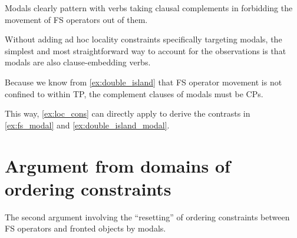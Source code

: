 \documentclass[11pt]{article}
\let\latextextsubscript\textsubscript
\let\textsubscript\latextextsubscript
\newcommand{\gap}[1]{\rule{1em}{0.4pt}\textsubscript{#1}}
\newcommand{\F}{\ensuremath{_{\mathrm{F}}}}
\begin{document}

Modals clearly pattern with verbs taking clausal complements in forbidding the movement of FS operators out of them.

Without adding ad hoc locality constraints specifically targeting modals, the simplest and most straightforward way to account for the observations is that modals are also clause-embedding verbs.


Because we know from \cref{ex:double_island} that FS operator movement is not confined to within TP, the complement clauses of modals must be CPs.

This way, \cref{ex:loc_cons} can directly apply to derive the contrasts in \cref{ex:fs_modal} and \cref{ex:double_island_modal}.

%

\section{Argument from domains of ordering constraints}
\label{sec:argument_from_domains_of_ordering_constraints}


The second argument involving the ``resetting'' of ordering constraints between FS operators and fronted objects by modals.
\end{document}
